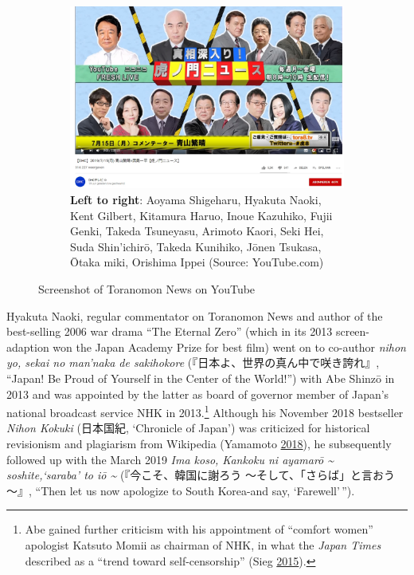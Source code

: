 \documentclass[10pt,british,A4paper,oneside]{memoir}
\begin{document}
\begin{figure}[!htb]
 \centering
 \begin{subfigure}[b]{0.5\textwidth}
 \includegraphics[width=\textwidth]{images/2channel/toranomon.jpg} 
 \captionsetup[sub]{font=scriptsize}
 \caption*{\textbf{Left to right}: Aoyama Shigeharu, Hyakuta Naoki, Kent Gilbert, Kitamura Haruo, Inoue Kazuhiko, Fujii Genki, Takeda Tsuneyasu, Arimoto Kaori, Seki Hei, Suda Shin’ichirō, Takeda Kunihiko, Jōnen Tsukasa, Ōtaka miki, Orishima Ippei (Source: YouTube.com)}
 \end{subfigure}
 \caption{Screenshot of Toranomon News on YouTube}\label{fig:toranomon}
\end{figure}

Hyakuta Naoki, regular commentator on Toranomon News and author of the
best-selling 2006 war drama ``The Eternal Zero'' (which in its 2013
screen-adaption won the Japan Academy Prize for best film) went on to
co-author \emph{nihon yo, sekai no man'naka de sakihokore}
(『日本よ、世界の真ん中で咲き誇れ』, ``Japan! Be Proud of Yourself in
the Center of the World!'') with Abe Shinzō in 2013 and was appointed by
the latter as board of governor member of Japan's national broadcast
service NHK in 2013.\footnote{Abe gained further criticism with his
  appointment of ``comfort women'' apologist Katsuto Momii as chairman
  of NHK, in what the \emph{Japan Times} described as a ``trend toward
  self-censorship'' (Sieg
  \protect\hyperlink{ref-sieg_under_2015}{2015}).} Although his November
2018 bestseller \emph{Nihon Kokuki} (日本国紀, `Chronicle of Japan') was
criticized for historical revisionism and plagiarism from Wikipedia
(Yamamoto \protect\hyperlink{ref-yamamoto__2018}{2018}), he subsequently
followed up with the March 2019 \emph{Ima koso, Kankoku ni ayamarō
\textasciitilde{} soshite,`saraba' to iō \textasciitilde{}}
(『今こそ、韓国に謝ろう ～そして、「さらば」と言おう～』, ``Then let us
now apologize to South Korea-and say, `Farewell'\,'').
\end{document}
